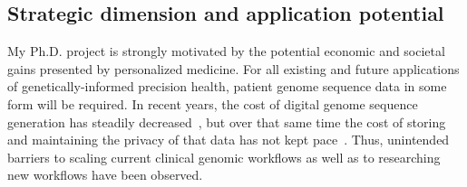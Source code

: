 \documentclass[a4paper,11pt]{article}
\begin{document}
\begin{refsection}
\section{Strategic dimension and application potential}
\begin{comment}
Elaborate the strategic dimension of your research, with regard to the 
(long-term) potential for innovative applications. 
Substantiate the PhD project’s strategic focus on economically relevant innovations. 

Justify how the chosen research approach (if successful) is the appropriate one to achieve the anticipated application(s) (potentially long term).

Elaborate the strategic importance of the potential applications to possible users (impact). 
Show how (if the project is successful) new products, services and/or processes may affect business of specific companies, a collective of companies and/or a sector and/or may be closely aligned with the Flemish science, technology and innovation transition priorities  (Flanders in transition. Priorities in Science, Technology and Innovation towards 2025) (socio-economic benefits). 

Societal impact should always be linked to a (in)direct (macro)economic benefit, e.g. cost reductions in health care, higher education level, environmental impact etc. should be positioned in an economic context.
\end{comment}
\smallskip

My Ph.D. project is strongly motivated by the potential economic and societal gains presented by personalized medicine. 
For all existing and future applications of genetically-informed precision health, patient genome sequence data in some form will be required.
In recent years, the cost of digital genome sequence generation has steadily decreased~\cite{wetterstrand_cost_2021}, but over that same time the cost of storing and maintaining the privacy of that data has not kept pace~\cite{storage_costs}.
Thus, unintended barriers to scaling current clinical genomic workflows as well as to researching new workflows have been observed.


\end{refsection}
\end{document}
